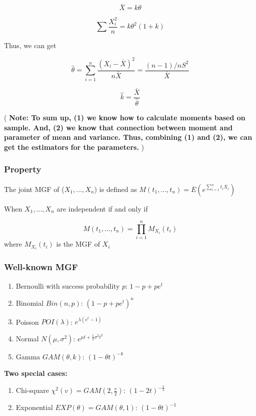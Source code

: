 \documentclass[]{book}
\begin{document}
\[\bar{X}=k\theta\]

\[\sum \frac{X_i^2}{n}=k\theta^2(1+k)\]

Thus, we can get

\[\hat{\theta}=\sum_{i=1}^n \frac{(X_i-\bar{X})^2}{n \bar{X}}=\frac{(n-1)/n S^2}{\bar{X}}\]

\[\hat{k}=\frac{\bar{X}}{\hat{\theta}}\]

( \textbf{Note: To sum up, (1) we know how to calculate moments based on sample. And, (2) we know that connection between moment and parameter of mean and variance. Thus, combining (1) and (2), we can get the estimators for the parameters.} )

\hypertarget{property}{%
\subsubsection{Property}\label{property}}

The joint MGF of (\(X_1, ..., X_n\)) is defined as \(M(t_1,...,t_n)=E(e^{\sum_{i=1}^nt_iX_i})\)

When \(X_1, ..., X_n\) are independent if and only if

\[M(t_1,...,t_n)=\prod_{i=1}^n M_{X_i}(t_i)\]
where \(M_{X_i}(t_i)\) is the MGF of \(X_i\)

\hypertarget{well-known-mgf}{%
\subsubsection{Well-known MGF}\label{well-known-mgf}}

\begin{enumerate}
\def\labelenumi{(\arabic{enumi})}
\item
  Bernoulli with success probability \(p\): \(1-p+pe^t\)
\item
  Binomial \(Bin(n,p)\): \((1-p+pe^t)^n\)
\item
  Poisson \(POI(\lambda)\): \(e^{\lambda(e^t-1)}\)
\item
  Normal \(N(\mu,\sigma^2)\): \(e^{\mu t+\frac{1}{2}\sigma^2t^2}\)
\item
  Gamma \(GAM(\theta,k)\): \((1-\theta t)^{-k}\)
\end{enumerate}

\textbf{Two special cases:}

\begin{enumerate}
\def\labelenumi{(\arabic{enumi})}
\setcounter{enumi}{5}
\item
  Chi-square \(\chi^2(v) =GAM(2,\frac{v}{2})\): \((1-2t)^{-\frac{v}{2}}\)
\item
  Exponential \(EXP(\theta)=GAM(\theta,1)\): \((1-\theta t)^{-1}\)
\end{enumerate}
\end{document}
